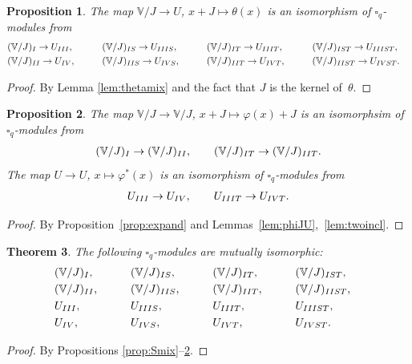 \documentclass[11pt]{article}
\numberwithin{equation}{section}
\numberwithin{equation}{section}
\newtheorem{Theorem}{Theorem}[section]
\newtheorem{Proposition}[Theorem]{Proposition}
 { \theoremstyle{definition}
\newtheorem{Definition}[Theorem]{Definition}
\newtheorem{Example}[Theorem]{Example}
\newtheorem{Note}[Theorem]{Note}
}
\begin{document}
{\begin{Proposition}\label{prop:thetamix}The map $\mathbb V/J\to U$, $x+J\mapsto \theta(x)$ is an isomorphism of $\square_q$-modules from
\begin{alignat*}{5}
&(\mathbb V/J)_{\rm I} \rightarrow U_{\rm III}, \qquad &&
(\mathbb V/J)_{\rm IS} \rightarrow U_{\rm IIIS}, \qquad &&
(\mathbb V/J)_{\rm IT} \rightarrow U_{\rm IIIT}, \qquad &&
(\mathbb V/J)_{\rm IST} \rightarrow U_{\rm IIIST},&\\
&(\mathbb V/J)_{\rm II} \rightarrow U_{\rm IV}, \qquad &&
(\mathbb V/J)_{\rm IIS} \rightarrow U_{\rm IVS}, \qquad &&
(\mathbb V/J)_{\rm IIT} \rightarrow U_{\rm IVT}, \qquad &&
(\mathbb V/J)_{\rm IIST} \rightarrow U_{\rm IVST}.&
\end{alignat*}
\end{Proposition}
\begin{proof}By Lemma \ref{lem:thetamix} and the fact that $J$ is the kernel of~$\theta$.
\end{proof}

\begin{Proposition}\label{prop:varphimix}The map $\mathbb V/J\to \mathbb V/J$, $x+J\mapsto \varphi(x)+J$ is an isomorphsim of $\square_q$-modules from
\begin{gather*}
 (\mathbb V/J)_{\rm I} \rightarrow (\mathbb V/J)_{\rm II}, \qquad (\mathbb V/J)_{\rm IT} \rightarrow (\mathbb V/J)_{\rm IIT}.
\end{gather*}
The map $U\to U$, $x\mapsto \varphi^*(x)$
is an isomorphism of $\square_q$-modules from
\begin{gather*}
 U_{\rm III} \rightarrow U_{\rm IV}, \qquad U_{\rm IIIT} \rightarrow U_{\rm IVT}.
\end{gather*}
\end{Proposition}
\begin{proof} By Proposition~\ref{prop:expand} and Lemmas~\ref{lem:phiJU},~\ref{lem:twoincl}.
\end{proof}

\begin{Theorem}\label{thm:alliso}The following $\square_q$-modules are mutually isomorphic:
\begin{alignat*}{5}
& (\mathbb V/J)_{\rm I}, \qquad&&
(\mathbb V/J)_{\rm IS}, \qquad&&
(\mathbb V/J)_{\rm IT}, \qquad&&
(\mathbb V/J)_{\rm IST},&\\
& (\mathbb V/J)_{\rm II}, \qquad&&
(\mathbb V/J)_{\rm IIS}, \qquad&&
(\mathbb V/J)_{\rm IIT}, \qquad&&
(\mathbb V/J)_{\rm IIST},&\\
&U_{\rm III}, \qquad &&
U_{\rm IIIS}, \qquad &&
U_{\rm IIIT}, \qquad &&
U_{\rm IIIST},&\\
&U_{\rm IV}, \qquad &&
U_{\rm IVS}, \qquad&&
U_{\rm IVT}, \qquad &&
U_{\rm IVST}.&
\end{alignat*}
\end{Theorem}
\begin{proof} By Propositions \ref{prop:Smix}--\ref{prop:varphimix}.
\end{proof}

}
\end{document}

